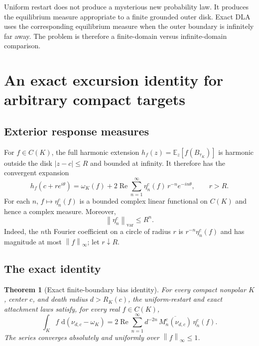 \documentclass[11pt]{article}
\theoremstyle{mainthm}
\newtheorem{theorem}{Theorem}[section]
\theoremstyle{definition}
\theoremstyle{remark}
\newcommand{\E}{\mathbb E}
\newcommand{\dd}{\,\mathrm d}
\newcommand{\Real}{\operatorname{Re}}
\newcommand{\norm}[1]{\left\lVert #1\right\rVert}
\begin{document}
\begin{plainbox}
Uniform restart does not produce a mysterious new probability law. It produces the equilibrium measure appropriate to a finite grounded outer disk. Exact DLA uses the corresponding equilibrium measure when the outer boundary is infinitely far away. The problem is therefore a finite-domain versus infinite-domain comparison.
\end{plainbox}

\section{An exact excursion identity for arbitrary compact targets}

\subsection{Exterior response measures}

For $f\in C(K)$, the full harmonic extension $h_f(z)=\E_z[f(B_{\tau_K})]$ is harmonic outside the disk $|z-c|\le R$ and bounded at infinity. It therefore has the convergent expansion
\begin{equation}
  h_f(c+re^{i\theta})
  =\omega_K(f)
  +2\Real\sum_{n=1}^{\infty}
     \eta_n^c(f)\,r^{-n}e^{-in\theta},
  \qquad r>R.
  \label{eq:exterior-expansion}
\end{equation}
For each $n$, $f\mapsto\eta_n^c(f)$ is a bounded complex linear functional on $C(K)$ and hence a complex measure. Moreover,
\begin{equation}
  \norm{\eta_n^c}_{\mathrm{var}}\le R^n.
  \label{eq:eta-bound}
\end{equation}
Indeed, the $n$th Fourier coefficient on a circle of radius $r$ is $r^{-n}\eta_n^c(f)$ and has magnitude at most $\norm{f}_\infty$; let $r\downarrow R$.

\subsection{The exact identity}

\begin{theorem}[Exact finite-boundary bias identity]
\label{thm:exact-identity}
For every compact nonpolar $K$, center $c$, and death radius $d>R_K(c)$, the uniform-restart and exact attachment laws satisfy, for every real $f\in C(K)$,
\begin{equation}
\boxed{
  \int_K f\,\dd(\nu_{d,c}-\omega_K)
  =2\Real\sum_{n=1}^{\infty}
     d^{-2n}\,
     \overline{M_n^c(\nu_{d,c})}\,
     \eta_n^c(f).
}
\label{eq:exact-weak}
\end{equation}
The series converges absolutely and uniformly over $\norm{f}_\infty\le1$.
\end{theorem}
\end{document}
